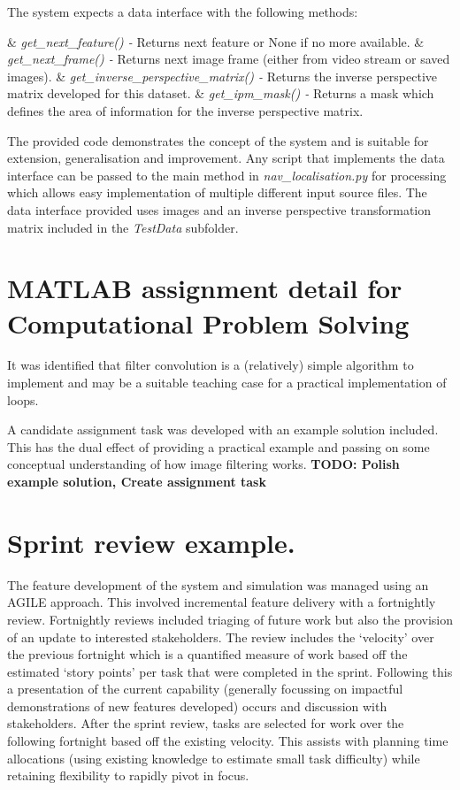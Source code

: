 \documentclass{article}
\begin{document}
The system expects a data interface with the following methods:

\begin{easylist}[itemize]
	& \textit{get\_next\_feature() -} Returns next feature or None if no more available.
	& \textit{get\_next\_frame() -}	Returns next image frame (either from video stream or saved images).
	& \textit{get\_inverse\_perspective\_matrix() -} Returns the inverse perspective matrix developed for this dataset.
	& \textit{get\_ipm\_mask() -} Returns a mask which defines the area of information for the inverse perspective matrix.
\end{easylist}

The provided code demonstrates the concept of the system and is suitable for extension, generalisation and improvement. Any script that implements the data interface can be passed to the main method in \textit{nav\_localisation.py} for processing which allows easy implementation of multiple different input source files. The data interface provided uses images and an inverse perspective transformation matrix included in the \textit{TestData} subfolder. 


\section{MATLAB assignment detail for Computational Problem Solving}

It was identified that filter convolution is a (relatively) simple algorithm to implement and may be a suitable teaching case for a practical implementation of loops.

A candidate assignment task was developed with an example solution included. This has the dual effect of providing a practical example and passing on some conceptual understanding of how image filtering works.
\textbf{TODO: Polish example solution, Create assignment task}

\section{Sprint review example.}

The feature development of the system and simulation was managed using an AGILE approach. This involved incremental feature delivery with a fortnightly review. Fortnightly reviews included triaging of future work but also the provision of an update to interested stakeholders. The review includes the `velocity' over the previous fortnight which is a quantified measure of work based off the estimated `story points' per task that were completed in the sprint. Following this a presentation of the current capability (generally focussing on impactful demonstrations of new features developed) occurs and discussion with stakeholders. After the sprint review, tasks are selected for work over the following fortnight based off the existing velocity. This assists with planning time allocations (using existing knowledge to estimate small task difficulty) while retaining flexibility to rapidly pivot in focus.
\end{document}
